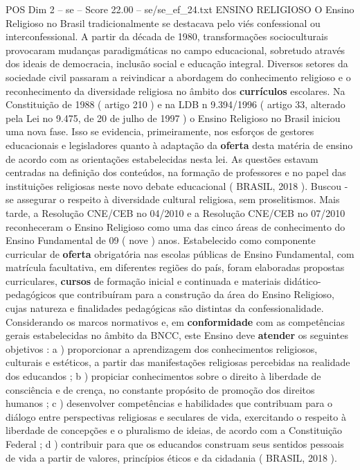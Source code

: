 \begin{textsample}{POS Dim 2 – se – Score 22.00 – se/se\_ef\_24.txt}  \label{ex:f2_pos_028}
ENSINO RELIGIOSO O Ensino Religioso no Brasil tradicionalmente se destacava pelo viés confessional ou interconfessional.
A partir da década de 1980, transformações socioculturais provocaram mudanças paradigmáticas no campo educacional, sobretudo através dos ideais de democracia, inclusão social e educação integral.
Diversos setores da sociedade civil passaram a reivindicar a abordagem do conhecimento religioso e o reconhecimento da diversidade religiosa no âmbito dos \textbf{currículos} escolares.
Na Constituição de 1988 ( artigo 210 ) e na LDB n 9.394/1996 ( artigo 33, alterado pela Lei no 9.475, de 20 de julho de 1997 ) o Ensino Religioso no Brasil iniciou uma nova fase.
Isso se evidencia, primeiramente, nos esforços de gestores educacionais e legisladores quanto à adaptação da \textbf{oferta} desta matéria de ensino de acordo com as orientações estabelecidas nesta lei.
As questões estavam centradas na definição dos conteúdos, na formação de professores e no papel das instituições religiosas neste novo debate educacional ( BRASIL, 2018 ).
Buscou -se assegurar o respeito à diversidade cultural religiosa, sem proselitismos.
Mais tarde, a Resolução CNE/CEB no 04/2010 e a Resolução CNE/CEB no 07/2010 reconheceram o Ensino Religioso como uma das cinco áreas de conhecimento do Ensino Fundamental de 09 ( nove ) anos.
Estabelecido como componente curricular de \textbf{oferta} obrigatória nas escolas públicas de Ensino Fundamental, com matrícula facultativa, em diferentes regiões do país, foram elaboradas propostas curriculares, \textbf{cursos} de formação inicial e continuada e materiais didático-pedagógicos que contribuíram para a construção da área do Ensino Religioso, cujas natureza e finalidades pedagógicas são distintas da confessionalidade.
Considerando os marcos normativos e, em \textbf{conformidade} com as competências gerais estabelecidas no âmbito da BNCC, este Ensino deve \textbf{atender} os seguintes objetivos : a ) proporcionar a aprendizagem dos conhecimentos religiosos, culturais e estéticos, a partir das manifestações religiosas percebidas na realidade dos educandos ; b ) propiciar conhecimentos sobre o direito à liberdade de consciência e de crença, no constante propósito de promoção dos direitos humanos ; c ) desenvolver competências e habilidades que contribuam para o diálogo entre perspectivas religiosas e seculares de vida, exercitando o respeito à liberdade de concepções e o pluralismo de ideias, de acordo com a Constituição Federal ; d ) contribuir para que os educandos construam seus sentidos pessoais de vida a partir de valores, princípios éticos e da cidadania ( BRASIL, 2018 ).

\end{textsample}
